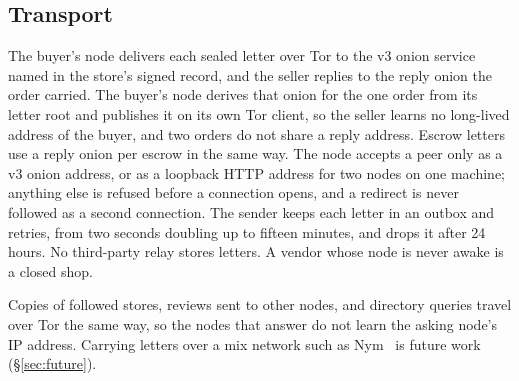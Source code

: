 \subsection{Transport}
\label{sec:transport}

The buyer's node delivers each sealed letter over Tor to the v3 onion service~\citep{torrendv3} named in the store's signed record, and the seller replies to the reply onion the order carried. The buyer's node derives that onion for the one order from its letter root and publishes it on its own Tor client, so the seller learns no long-lived address of the buyer, and two orders do not share a reply address. Escrow letters use a reply onion per escrow in the same way. The node accepts a peer only as a v3 onion address, or as a loopback HTTP address for two nodes on one machine; anything else is refused before a connection opens, and a redirect is never followed as a second connection. The sender keeps each letter in an outbox and retries, from two seconds doubling up to fifteen minutes, and drops it after 24 hours. No third-party relay stores letters. A vendor whose node is never awake is a closed shop.

Copies of followed stores, reviews sent to other nodes, and directory queries travel over Tor the same way, so the nodes that answer do not learn the asking node's IP address. Carrying letters over a mix network such as Nym~\citep{diaz2021nym,piotrowska2017loopix} is future work (\S\ref{sec:future}).

